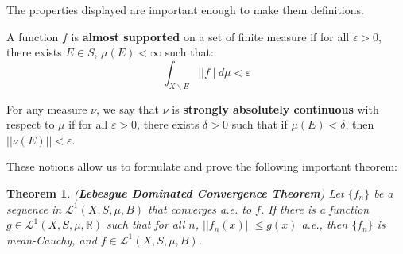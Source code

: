 \documentclass[a4paper,12pt]{report}
\newcommand{\ms}[1]{\mathscr{#1}}
\newcommand{\varep}{ \varepsilon }
\newcommand{\bs} {\backslash}
\newtheorem{theorem}{Theorem}[section]
\newenvironment{definition}[1][Definition.]{\begin{trivlist}
\item[\hskip \labelsep {\bfseries #1}]}{\end{trivlist}}
\begin{document}
	\noindent The properties displayed are important enough to make them definitions.
	
	\begin{definition}
	A function $f$ is \textbf{almost supported} on a set of finite measure if for all $\varep > 0$, there exists $E \in S$, $\mu(E) < \infty$ such that:
	\[ \int_{X \bs E} ||f|| ~ d\mu < \varep \]
	\end{definition}	
	
	\begin{definition}
	For any measure $\nu$, we say that $\nu$ is \textbf{strongly absolutely continuous} with respect to $\mu$ if for all $\varep > 0$, there exists $\delta > 0$ such that if $\mu(E) < \delta$, then $||\nu(E)|| < \varep$. 
	\end{definition}
	
	\noindent These notions allow us to formulate and prove the following important theorem:
	\begin{theorem}
	\emph{(\textbf{Lebesgue Dominated Convergence Theorem})}
	Let $\{f_n\}$ be a sequence in $\ms{L}^1(X, S, \mu, B)$ that converges a.e. to $f$. If there is a function $g \in \ms{L}^1(X, S, \mu, \mathbb{R})$ such that for all $n$, $||f_n(x)|| \leq g(x)$ a.e., then $\{f_n\}$ is mean-Cauchy, and $f \in \ms{L}^1(X, S, \mu, B)$. 
	\end{theorem}
\end{document}
